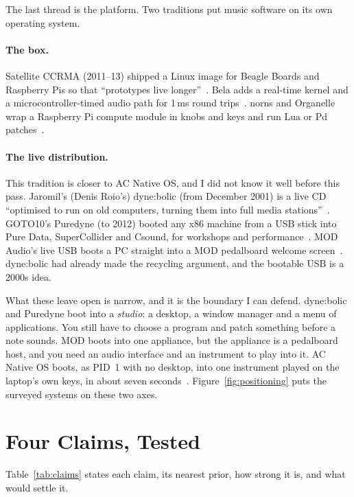 \documentclass[10pt,letterpaper,twocolumn]{article}
\newcommand{\acos}{AC Native OS}
\begin{document}
The last thread is the platform. Two traditions put music software on its own operating system.

\paragraph{The box.} Satellite CCRMA (2011--13) shipped a Linux image for Beagle Boards and Raspberry Pis so that ``prototypes live longer''~\citep{berdahl2013satellite}. Bela adds a real-time kernel and a microcontroller-timed audio path for 1\,ms round trips~\citep{moro2016bela}. norns and Organelle wrap a Raspberry Pi compute module in knobs and keys and run Lua or Pd patches~\citep{monome_norns,cg_organelle}.

\paragraph{The live distribution.} This tradition is closer to \acos{}, and I did not know it well before this pass. Jaromil's (Denis Roio's) dyne:bolic (from December 2001) is a live CD ``optimised to run on old computers, turning them into full media stations''~\citep{jaromil_dynebolic}. GOTO10's Puredyne (to 2012) booted any x86 machine from a USB stick into Pure Data, SuperCollider and Csound, for workshops and performance~\citep{puredyne}. MOD Audio's live USB boots a PC straight into a MOD pedalboard welcome screen~\citep{mod_liveusb}. dyne:bolic had already made the recycling argument, and the bootable USB is a 2000s idea.

What these leave open is narrow, and it is the boundary I can defend. dyne:bolic and Puredyne boot into a \emph{studio}: a desktop, a window manager and a menu of applications. You still have to choose a program and patch something before a note sounds. MOD boots into one appliance, but the appliance is a pedalboard host, and you need an audio interface and an instrument to play into it. \acos{} boots, as PID~1 with no desktop, into one instrument played on the laptop's own keys, in about seven seconds~\citep{scudder2026os}. Figure~\ref{fig:positioning} puts the surveyed systems on these two axes.


\section{Four Claims, Tested}
\label{sec:claims}

Table~\ref{tab:claims} states each claim, its nearest prior, how strong it is, and what would settle it.
\end{document}
